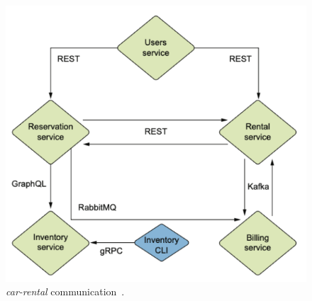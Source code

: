 \begin{figure}[htbp]
    \centering
    \includegraphics[width=.7\textwidth]{images/2-car-rental/comunication.pdf}
    \caption{\textit{car-rental} communication~\cite{quarkusinaction}.}
    \label{fig:communication}
\end{figure}